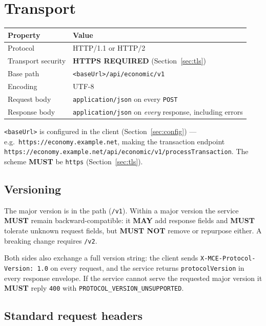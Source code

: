 \documentclass[11pt,a4paper]{article}
\newcommand{\code}[1]{\texttt{\small #1}}
\newcommand{\req}{\textbf{MUST}}
\newcommand{\opt}{\textbf{MAY}}
\begin{document}
\section{Transport}

\begin{tabularx}{\linewidth}{L{4.2cm} X}
\toprule
\textbf{Property} & \textbf{Value}\\
\midrule
Protocol            & HTTP/1.1 or HTTP/2\\
Transport security  & \textbf{HTTPS REQUIRED} (Section~\ref{sec:tls})\\
Base path           & \code{<baseUrl>/api/economic/v1}\\
Encoding            & UTF-8\\
Request body        & \code{application/json} on every \code{POST}\\
Response body       & \code{application/json} on \emph{every} response, including errors\\
\bottomrule
\end{tabularx}

\code{<baseUrl>} is configured in the client (Section~\ref{sec:config}) --- e.g.\
\code{https://economy.example.net}, making the transaction endpoint\\
\code{https://economy.example.net/api/economic/v1/processTransaction}. The scheme \req{} be
\code{https} (Section~\ref{sec:tls}).

\subsection{Versioning}

The major version is in the path (\code{/v1}). Within a major version the service \req{} remain
backward-compatible: it \opt{} add response fields and \req{} tolerate unknown request fields, but
\textbf{MUST NOT} remove or repurpose either. A breaking change requires \code{/v2}.

Both sides also exchange a full version string: the client sends
\code{X-MCE-Protocol-Version:~1.0} on every request, and the service returns
\code{protocolVersion} in every response envelope. If the service cannot serve the requested major
version it \req{} reply \code{400} with \code{PROTOCOL\_VERSION\_UNSUPPORTED}.

\subsection{Standard request headers}
\label{sec:reqheaders}
\end{document}
